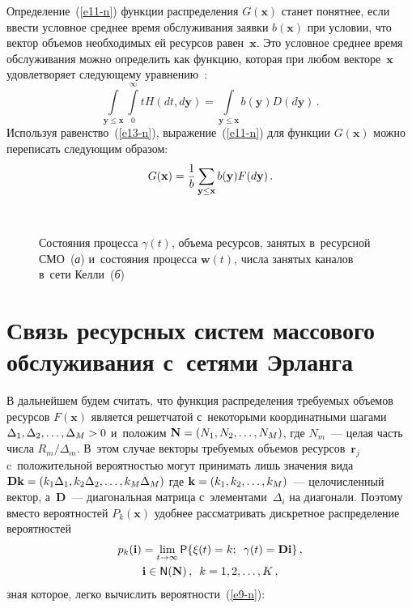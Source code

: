 \begin{multicols}{2}
  Определение~(\ref{e11-n}) функции распределения $G(\mathbf{x})$ станет 
понятнее, если ввести условное среднее время обслуживания заявки 
$b(\mathbf{x})$ при условии, что вектор объемов необходимых ей ресурсов 
равен~$\mathbf{x}$. Это условное среднее время обслуживания можно 
определить как функцию, которая при любом векторе~$\mathbf{x}$ 
удовлетворяет следующему уравнению~\cite{9-n}:
  \begin{equation}
  \int\limits_{\mathbf{y}\leq \mathbf{x}}\int\limits_0^\infty tH(dt,d\mathbf{y})= 
\int\limits_{\mathbf{y}\leq \mathbf{x}} b(\mathbf{y}) D(d\mathbf{y})\,.
  \label{e13-n}
  \end{equation}
Используя равенство~(\ref{e13-n}), выражение~(\ref{e11-n}) для функции 
$G(\mathbf{x})$ можно переписать следующим образом:
\begin{equation}
G(\mathbf{x}) = \displaystyle\frac{\displaystyle 1\mathstrut}{\displaystyle b\mathstrut}\sum\limits_{\mathbf{y}\leq\mathbf{x}} b(\mathbf{y}) 
F(d\mathbf{y})\,.
\label{e14-n}
\end{equation}

\begin{figure*}
\vspace*{1pt}
 \begin{center}  
\mbox{%
 \epsfxsize=147.923mm
 }
\end{center} 
\noindent
{\small Состояния процесса $\gamma(t)$, объема ресурсов, занятых 
в~ресурсной СМО~(\textit{а}) и~состояния процесса $\mathbf{w}(t)$, числа занятых 
каналов в~сети Келли~(\textit{б})}
\end{figure*}

\section{Связь ресурсных систем массового обслуживания с~сетями 
Эрланга}
  
  В дальнейшем будем считать, что функция распределения требуемых 
объемов ресурсов $F(\mathbf{x})$ является решетчатой с~некоторыми 
координатными шагами $\Delta_1, \Delta_2, \ldots, \Delta_M\hm>0$ и~положим 
$\mathbf{N}\hm= (N_1,N_2, \ldots ,N_M)$, где $N_m$~--- целая часть числа 
$R_m/\Delta_m$. В~этом случае векторы требуемых объемов 
ресурсов~$\mathbf{r}_j$ c~положительной вероятностью могут принимать 
лишь значения вида $\mathbf{Dk}\hm= (k_1\Delta_1, k_2\Delta_2, \ldots , 
k_M\Delta_M)$ где $\mathbf{k}\hm= (k_1, k_2, \ldots , k_M)$~--- целочисленный 
вектор, а~$\mathbf{D}$~--- диагональная матрица с~элементами~$\Delta_i$ на 
диагонали. Поэтому вместо вероятностей $P_k(\mathbf{x})$ удобнее 
рассматривать дискретное распределение вероятностей 
  \begin{multline}
    p_k(\mathbf{i}) =\lim\limits_{t\to\infty} {\sf P}\{\xi(t)=k; \enskip
\gamma(t)=\mathbf{Di}\}\,,\\
\mathbf{i}\in{\sf N}(\mathbf{N})\,,\enskip k=1,2,\ldots ,K\,,
  \label{e15-n}
 \end{multline}
зная которое, легко вычислить вероятности~(\ref{e9-n}):


\end{multicols}
